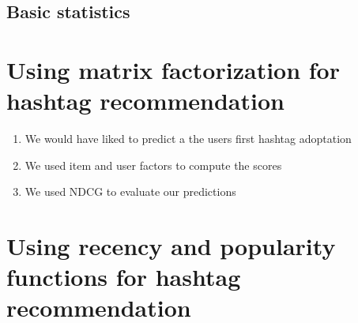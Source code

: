 \subsection{Basic statistics}

\section{Using matrix factorization for hashtag recommendation}
\begin{enumerate}
\item We would have liked to predict a the users first hashtag adoptation
\item We used item and user factors to compute the scores
\item We used NDCG to evaluate our predictions 
\end{enumerate}

\section{Using recency and popularity functions for hashtag recommendation}
